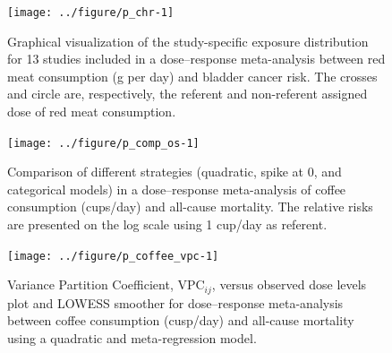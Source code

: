 \documentclass[11pt,a4paper,twoside,openany]{book}\usepackage{knitr}
\begin{document}
{\begin{knitrout}
\end{knitrout}

\begin{knitrout}\footnotesize
{}\color{fgcolor}\begin{figure}[ht!]

{\centering \texttt{[image: ../figure/p\_chr-1]} 

}

\caption[Graphical visualization of the study-specific exposure distribution for 13 studies included in a dose--response meta-analysis between red meat consumption (g per day) and bladder cancer risk]{Graphical visualization of the study-specific exposure distribution for 13 studies included in a dose--response meta-analysis between red meat consumption (g per day) and bladder cancer risk. The crosses and circle are, respectively, the referent and non-referent assigned dose of red meat consumption.}\label{fig:p_chr}
\end{figure}


\end{knitrout}

\begin{knitrout}\footnotesize
{}\color{fgcolor}\begin{figure}[ht!]

{\centering \texttt{[image: ../figure/p\_comp\_os-1]} 

}

\caption[Comparison of different strategies (quadratic, spike at 0, and categorical models) in a dose--response meta-analysis of coffee consumption (cups/day) and all-cause mortality]{Comparison of different strategies (quadratic, spike at 0, and categorical models) in a dose--response meta-analysis of coffee consumption (cups/day) and all-cause mortality. The relative risks are presented on the log scale using 1 cup/day as referent.}\label{fig:p_comp_os}
\end{figure}


\end{knitrout}

\begin{knitrout}\footnotesize
{}\color{fgcolor}\begin{figure}[ht!]

{\centering \texttt{[image: ../figure/p\_coffee\_vpc-1]} 

}

\caption[Variance Partition Coefficient, $\textrm{VPC}_{ij}$, versus observed dose levels plot and LOWESS smoother for dose--response meta-analysis between coffee consumption (cusp/day) and all-cause mortality using a quadratic and meta-regression model]{Variance Partition Coefficient, $\textrm{VPC}_{ij}$, versus observed dose levels plot and LOWESS smoother for dose--response meta-analysis between coffee consumption (cusp/day) and all-cause mortality using a quadratic and meta-regression model.}\label{fig:p_coffee_vpc}
\end{figure}



\end{knitrout}}
\end{document}
